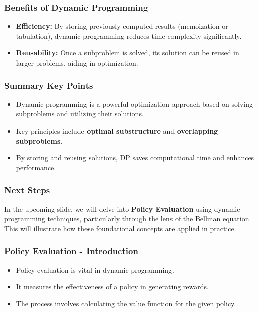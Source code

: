 \documentclass{beamer}
\begin{document}
\begin{frame}[fragile]
    \frametitle{Benefits of Dynamic Programming}
    \begin{itemize}
        \item \textbf{Efficiency:} 
        By storing previously computed results (memoization or tabulation), dynamic programming reduces time complexity significantly.
        \item \textbf{Reusability:} 
        Once a subproblem is solved, its solution can be reused in larger problems, aiding in optimization.
    \end{itemize}
\end{frame}

\begin{frame}[fragile]
    \frametitle{Summary Key Points}
    \begin{itemize}
        \item Dynamic programming is a powerful optimization approach based on solving subproblems and utilizing their solutions.
        \item Key principles include \textbf{optimal substructure} and \textbf{overlapping subproblems}.
        \item By storing and reusing solutions, DP saves computational time and enhances performance.
    \end{itemize}
\end{frame}

\begin{frame}[fragile]
    \frametitle{Next Steps}
    In the upcoming slide, we will delve into \textbf{Policy Evaluation} using dynamic programming techniques, particularly through the lens of the Bellman equation. 
    This will illustrate how these foundational concepts are applied in practice.
\end{frame}

\begin{frame}[fragile]
    \frametitle{Policy Evaluation - Introduction}
    \begin{itemize}
        \item Policy evaluation is vital in dynamic programming.
        \item It measures the effectiveness of a policy in generating rewards.
        \item The process involves calculating the value function for the given policy.
    \end{itemize}
\end{frame}
\end{document}
